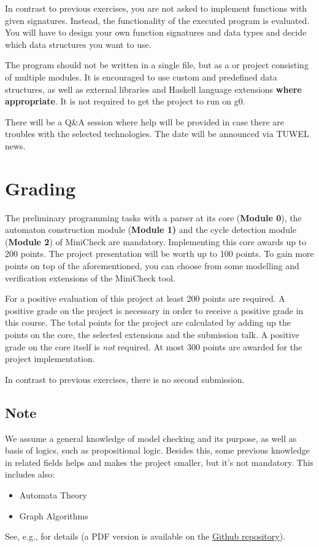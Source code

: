 \documentclass{article}
\begin{document}
In contrast to previous exercises, you are not asked to implement functions with given signatures. 
Instead, the functionality of the executed program is evaluated. 
You will have to design your own function signatures and data types and decide 
which data structures you want to use.

The program should not be written in a single file, but as a \href{https://docs.haskellstack.org/en/stable/README/}{} 
or \href{https://cabal.readthedocs.io/en/3.4/}{} project consisting of multiple modules. 
It is encouraged to use custom and predefined data structures, as well as external libraries 
and Haskell language extensions \textbf{where appropriate}. It is not required to get the project to run on g0.

There will be a Q\&A session where help will be provided in case there are troubles with the selected technologies. 
The date will be announced via TUWEL news.

\section{Grading}

The preliminary programming tasks with a parser at its core (\textbf{Module 0}), the automaton construction module 
(\textbf{Module 1)} and
the cycle detection module (\textbf{Module 2}) of MiniCheck are mandatory. 
Implementing this core awards up to 200 points. The project presentation will be worth up to 100 points. 
To gain more points on top of the aforementioned, you can choose from some modelling 
and verification extensions of the MiniCheck tool.

For a positive evaluation of this project at least 200 points are required. 
A positive grade on the project is necessary in order to receive a positive grade in this course. 
The total points for the project are calculated by adding up the points on the core, 
the selected extensions and the submission talk. A positive grade on the core itself is \textit{not} required. 
At most 300 points are awarded for the project implementation.

In contrast to previous exercises, there is no second submission.

\subsection{Note}
We assume a general knowledge of model checking and its purpose, as well as basis of logics,
such as propositional logic.  Besides this, some previous knowledge in related fields helps 
and makes the project smaller, but it's not mandatory. This includes also:
\begin{itemize}
    \item Automata Theory
    \item Graph Algorithms
\end{itemize}
See, e.g., \cite{BaKa} for details (a PDF version is available on the 
\href{https://github.com/francescopont/MiniCheck.git}{Github repository}).
\end{document}
